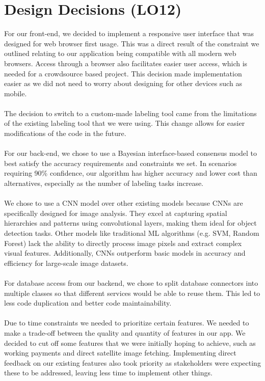 \documentclass{article}
\begin{document}
\section{Design Decisions (LO12)}
For our front-end, we decided to implement a responsive user interface that was designed for web browser first usage. This was a direct result of the constraint we outlined relating to our application being compatible with all modern web browsers. Access through a browser also facilitates easier user access, which is needed for a crowdsource based project. This decision made implementation easier as we did not need to worry about designing for other devices such as mobile.
\\\\
The decision to switch to a custom-made labeling tool came from the limitations of the existing labeling tool that we were using. This change allows for easier modifications of the code in the future.
\\\\
For our back-end, we chose to use a Bayesian interface-based consensus model to best satisfy the accuracy requirements and constraints we set. In scenarios requiring 90\% confidence, our algorithm has higher accuracy and lower cost than alternatives, especially as the number of labeling tasks increase. 
\\\\
We chose to use a CNN model over other existing models because CNNs are specifically designed for image analysis. They excel at capturing spatial hierarchies and patterns using convolutional layers, making them ideal for object detection tasks. Other models like traditional ML algorithms (e.g. SVM, Random Forest) lack the ability to directly process image pixels and extract complex visual features. Additionally, CNNs outperform basic models in accuracy and efficiency for large-scale image datasets.
\\\\
For database access from our backend, we chose to split database connectors into multiple classes so that different services would be able to reuse them. This led to less code duplication and better code maintainability.
\\\\
Due to time constraints we needed to prioritize certain features. We
needed to make a trade-off between the quality and quantity of features
in our app. We decided to cut off some features that we were initially hoping to achieve, such as working payments and direct satellite image fetching. Implementing direct feedback on our existing features also took priority as stakeholders were expecting these to be addressed, leaving less time to implement other things.
\end{document}

